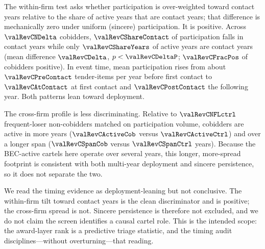The within-firm test asks whether participation is over-weighted
toward contact years relative to the share of active years that
are contact years; that difference is mechanically zero under
uniform (sincere) participation. It is positive. Across
$\valRevCNDelta$ cobidders, $\valRevCShareContact$ of
participation falls in contact years while only
$\valRevCShareYears$ of active years are contact years (mean
difference $\valRevCDelta$, $p<\valRevCDeltaP$; $\valRevCFracPos$
of cobidders positive). In event time, mean participation rises
from about $\valRevCPreContact$ tender-items per year before first
contact to $\valRevCAtContact$ at first contact and
$\valRevCPostContact$ the following year. Both patterns lean
toward deployment.

The cross-firm profile is less discriminating. Relative to
$\valRevCNFLctrl$ frequent-loser non-cobidders matched on
participation volume, cobidders are active in more years
($\valRevCActiveCob$ versus $\valRevCActiveCtrl$) and over a
longer span ($\valRevCSpanCob$ versus $\valRevCSpanCtrl$ years).
Because the BEC-active cartels here operate over several years,
this longer, more-spread footprint is consistent with both
multi-year deployment and sincere persistence, so it does not
separate the two.

We read the timing evidence as deployment-leaning but not
conclusive. The within-firm tilt toward contact years is the
clean discriminator and is positive; the cross-firm spread is
not. Sincere persistence is therefore not excluded, and we do not
claim the screen identifies a causal cartel role. This is the
intended scope: the award-layer rank is a predictive triage
statistic, and the timing audit disciplines---without
overturning---that reading.

